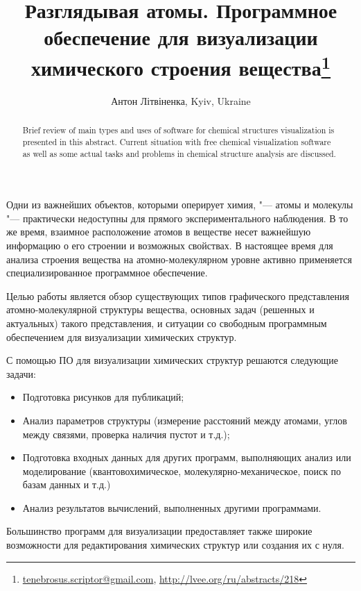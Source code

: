 \documentclass[10pt, a5paper]{article}
\begin{document}
\title{Разглядывая атомы. Программное обеспечение для визуализации химического строения вещества\footnote{\url{tenebrosus.scriptor@gmail.com}, \url{http://lvee.org/ru/abstracts/218}}}
\author{Антон Літвіненка, Kyiv, Ukraine}
\maketitle
\begin{abstract}
Brief review of main types and uses of software for chemical structures visualization is presented in this abstract. Current situation with free chemical visualization software as well as some actual tasks and problems in chemical structure analysis are discussed.
\end{abstract}
Одни из важнейших объектов, которыми оперирует химия, "--- атомы и молекулы "--- практически недоступны для прямого экспериментального наблюдения. В то же время, взаимное расположение атомов в веществе несет важнейшую информацию о его строении и возможных свойствах. В настоящее время для анализа строения вещества на атомно-молекулярном уровне активно применяется специализированное программное обеспечение.

Целью работы является обзор существующих типов графического представления атомно-молекулярной структуры вещества, основных задач (решенных и актуальных) такого представления, и ситуации со свободным программным обеспечением для визуализации химических структур.

С помощью ПО для визуализации химических структур решаются следующие задачи:

\begin{itemize}
  \item Подготовка рисунков для публикаций;
  \item Анализ параметров структуры (измерение расстояний между атомами, углов между связями, проверка наличия пустот и т.д.);
  \item Подготовка входных данных для других программ, выполняющих анализ или моделирование (квантовохимическое, \linebreak молекулярно-механическое, поиск по базам данных и т.д.)
  \item Анализ результатов вычислений, выполненных другими программами.
\end{itemize}

Большинство программ для визуализации предоставляет также широкие возможности для редактирования химических структур или создания их с нуля.
\end{document}
